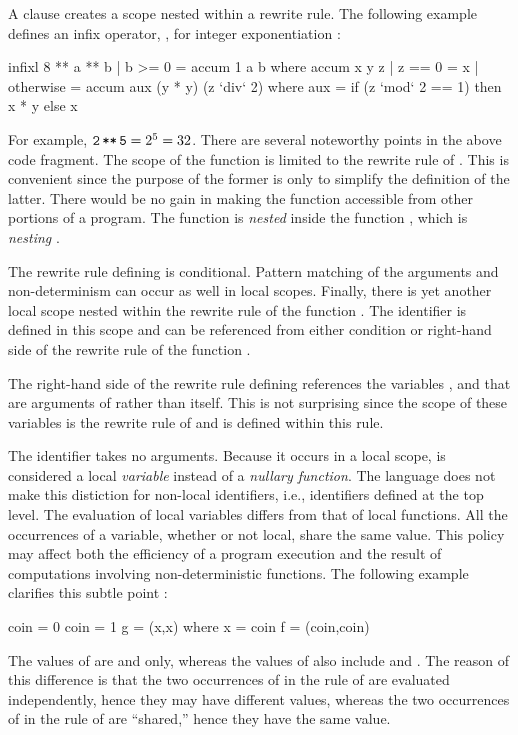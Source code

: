 A 
clause creates a scope nested within a rewrite rule.
The following example defines an infix operator, \ccode{**}, for
integer exponentiation
:
%
\begin{prog}
infixl 8 **
a ** b | b >= 0 = accum 1 a b
   where accum x y z | z == 0    = x
                     | otherwise = accum aux (y * y) (z `div` 2)
           where aux = if (z `mod` 2 == 1) then x * y else x
\end{prog}
%
For example, $\code{2\,**\,5}=2^5=32$.
There are several noteworthy points in the above code fragment.
The scope of the function  is limited to
the rewrite rule of \ccode{**}.
This is convenient since the purpose of the former
is only to simplify the definition of the latter.
There would be no gain in making the function 
accessible from other portions of a program.
The function  is \emph{nested}
inside the function \ccode{**}, which is \emph{nesting} .  

The rewrite rule defining  is conditional.
Pattern matching of the arguments and non-determinism
can occur as well in local scopes.
Finally, there is yet another local scope nested
within the rewrite rule of the function .
The identifier  is defined in this scope
and can be referenced from either condition or right-hand side
of the rewrite rule of the function .

The right-hand side of the rewrite rule defining 
references the variables ,  and 
that are arguments of  rather than  itself.
This is not surprising since the scope of these variables
is the rewrite rule of  and 
is defined within this rule.

The identifier  takes no arguments.
Because it occurs in a local scope,
 is considered
a local \emph{variable}
instead of a \emph{nullary function}.
The language does not make this distiction for non-local
identifiers, i.e., identifiers defined at the top level.
The evaluation of local variables differs from that of local functions.
All the occurrences of a variable,
whether or not local, share the same value.
This policy may affect both the efficiency of a program execution
and the result of computations involving non-deterministic
functions.  The following example clarifies this subtle point
:
%
\begin{prog}
coin = 0
coin = 1
\medskip
g = (x,x) where x = coin
\medskip
f = (coin,coin)
\end{prog}
%
The values of  are  and  only,
whereas the values of  also include 
 and .
The reason of this difference
is that the two occurrences of  in the rule of 
are evaluated independently, hence they may have different values,
whereas the two occurrences of 
in the rule of  are ``shared,'' hence they have the same value.

